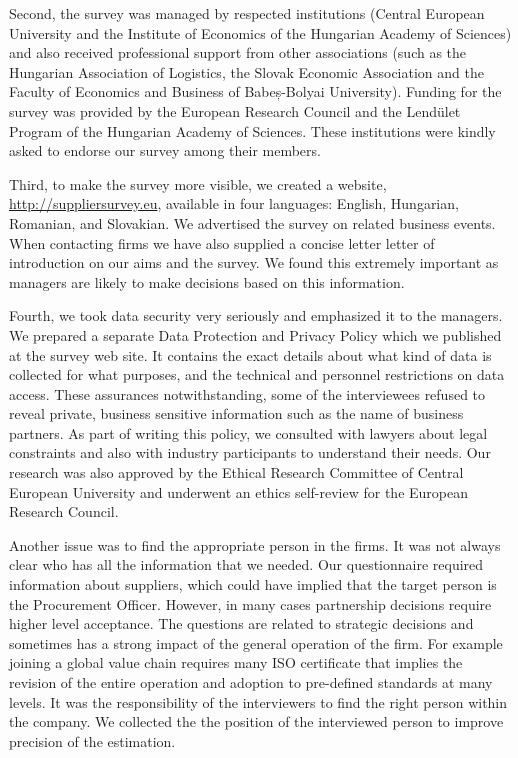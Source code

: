 \usepackage{}\documentclass[final, dvipsnames, authoryear,12pt]{elsarticle}
\begin{document}
Second, the survey was managed by respected institutions (Central European University and the Institute of Economics of the Hungarian Academy of Sciences) and also received professional support from other associations (such as the Hungarian Association of Logistics, the Slovak Economic Association and the Faculty of Economics and Business of Babeș-Bolyai University). Funding for the survey was provided by the European Research Council and the Lendület Program of the Hungarian Academy of Sciences. These institutions were kindly asked to endorse our survey among their members.

Third, to make the survey more visible, we created a website, \url{http://suppliersurvey.eu}, available in four languages: English, Hungarian, Romanian, and Slovakian. We advertised the survey on related business events.
When contacting firms we have also supplied a concise letter letter of introduction on our aims and the survey. We found this extremely important as managers are likely to make decisions based on this information.

Fourth, we took data security very seriously and emphasized it to the managers. We prepared a separate Data Protection and Privacy Policy which we published at the survey web site.  It contains the exact details about what kind of data is collected for what purposes, and the technical and personnel restrictions on data access. These assurances notwithstanding, some of the interviewees refused to reveal private, business sensitive information such as the name of business partners. As part of writing this policy, we consulted with lawyers about legal constraints and also with industry participants to understand their needs. Our research was also approved by the Ethical Research Committee of Central European University and underwent an ethics self-review for the European Research Council.   

Another issue was to find the appropriate person in the firms. It was not always clear who has all the information that we needed. Our questionnaire required information about suppliers, which could have implied that the target person is the Procurement Officer. However, in many cases partnership decisions require higher level acceptance. The questions are related to strategic decisions and sometimes has a strong impact of the general operation of the firm. For example joining a global value chain requires many ISO certificate that implies the revision of the entire operation and adoption to pre-defined standards at many levels. It was the responsibility of the interviewers to find the right person within the company. We collected the the position of the interviewed person to improve precision of the estimation.
\end{document}
